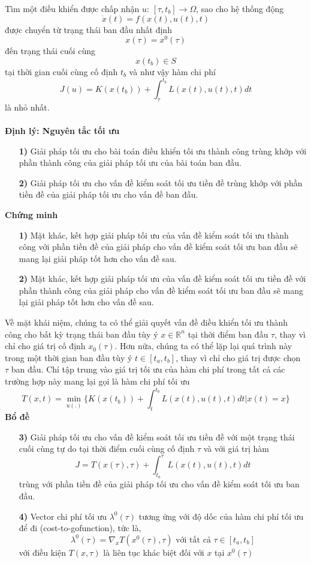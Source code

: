 \documentclass[12pt,a4paper]{report}
\begin{document}
	Tìm một điều khiển được chấp nhận $u$: $[\tau, t_b] \to \Omega$, sao cho hệ thống động $$\dot{x}(t) = f(x(t),u(t),t)$$ 
	được chuyển từ trạng thái ban đầu nhất định $$x(\tau) = x^0(\tau)$$ đến trạng thái cuối cùng $$x(t_b) \in S$$ tại thời gian cuối cùng cố định $t_b$ và như vậy hàm chi phí $$J(u) = K(x(t_b)) + \int_{\tau}^{t_b}L(x(t),u(t),t)dt$$ là nhỏ nhất.\\\\
	\textbf{Định lý: Nguyên tắc tối ưu}
	\begin{itemize}
		\item[\textbf{1)}] Giải pháp tối ưu cho bài toán điều khiển tối ưu thành công trùng khớp với phần thành công của giải pháp tối ưu của bài toán ban đầu.
		\item[\textbf{2)}] Giải pháp tối ưu cho vấn đề kiểm soát tối ưu tiền đề trùng khớp với phần tiền đề của giải pháp tối ưu cho vấn đề ban đầu. 
	\end{itemize}
	\textbf{Chứng minh}
	\begin{itemize}
		\item[\textbf{1)}] Mặt khác, kết hợp giải pháp tối ưu của vấn đề kiểm soát tối ưu thành công với phần tiền đề của giải pháp cho vấn đề kiểm soát tối ưu ban đầu sẽ mang lại giải pháp tốt hơn cho vấn đề sau.
		\item[\textbf{2)}] Mặt khác, kết hợp giải pháp tối ưu của vấn đề kiểm soát tối ưu tiền đề với phần thành công của giải pháp cho vấn đề kiểm soát tối ưu ban đầu sẽ mang lại giải pháp tốt hơn cho vấn đề sau.
	\end{itemize}
	Về mặt khái niệm, chúng ta có thể giải quyết vấn đề điều khiển tối ưu thành công cho bất kỳ trạng thái ban đầu tùy ý $x\in \mathbb{R}^n$ tại thời điểm ban đầu $\tau$, thay vì chỉ cho giá trị cố định $x_0(\tau)$. Hơn nữa, chúng ta có thể lặp lại quá trình này trong một thời gian ban đầu tùy ý $t \in [t_a, t_b]$, thay vì chỉ cho giá trị được chọn $\tau$ ban đầu. Chỉ tập trung vào giá trị tối ưu của hàm chi phí trong tất cả các trường hợp này mang lại gọi là hàm chi phí tối ưu $$T(x,t) = \min_{u(.)} \bigg\{K(x(t_b)) + \int_{t}^{t_b}L(x(t),u(t),t)dt \big | x(t) = x \bigg\}$$
	\textbf{Bổ đề}
	\begin{enumerate}
		\item[\textbf{3)}] Giải pháp tối ưu cho vấn đề kiểm soát tối ưu tiền đề với một
		trạng thái cuối cùng tự do tại thời điểm cuối cùng cố định $\tau$ và với giá trị hàm $$J = T(x(\tau), \tau) + \int_{t_a}^{\tau}L(x(t), u(t), t)dt$$ trùng với phần tiền đề của giải pháp tối ưu cho vấn đề kiểm soát tối ưu ban đầu.
		\item[\textbf{4)}] Vector chi phí tối ưu $\lambda^0(\tau)$ tương ứng với độ dốc của hàm chi phí tối ưu để đi (cost-to-gofunction), tức là, $$\lambda^0(\tau) = \nabla _xT(x^0(\tau), \tau) \text{ với tất cả } \tau \in [t_a, t_b]$$ với điều kiện $T(x, \tau) $ là liên tục khác biệt đối với $x$ tại $x^0(\tau)$
	\end{enumerate}
\end{document}
